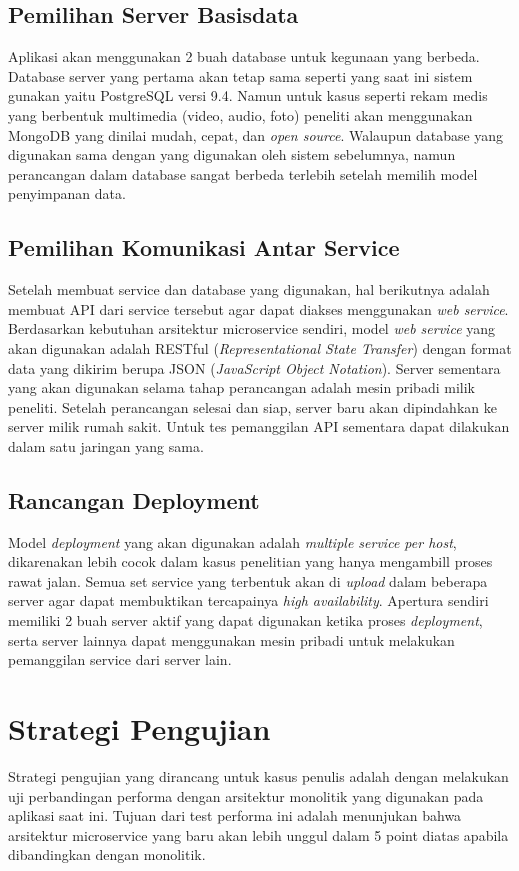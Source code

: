 \subsection{Pemilihan Server Basisdata}
Aplikasi akan menggunakan 2 buah database untuk kegunaan yang berbeda. Database server yang pertama akan tetap sama seperti yang saat ini sistem gunakan yaitu PostgreSQL versi 9.4. Namun untuk kasus seperti rekam medis yang berbentuk multimedia (video, audio, foto) peneliti akan menggunakan MongoDB yang dinilai mudah, cepat, dan \textit{open source}. Walaupun database yang digunakan sama dengan yang digunakan oleh sistem sebelumnya, namun perancangan dalam database sangat berbeda terlebih setelah memilih model penyimpanan data.
\subsection{Pemilihan Komunikasi Antar Service}
Setelah membuat service dan database yang digunakan, hal berikutnya adalah membuat API dari service tersebut agar dapat diakses menggunakan \textit{web service}. Berdasarkan kebutuhan arsitektur microservice sendiri, model \textit{web service} yang akan digunakan adalah RESTful (\textit{Representational State Transfer}) dengan format data yang dikirim berupa JSON (\textit{JavaScript Object Notation}). Server sementara yang akan digunakan selama tahap perancangan adalah mesin pribadi milik peneliti. Setelah perancangan selesai dan siap, server baru akan dipindahkan ke server milik rumah sakit. Untuk tes pemanggilan API sementara dapat dilakukan dalam satu jaringan yang sama.
\subsection{Rancangan Deployment}
Model \textit{deployment} yang akan digunakan adalah \textit{multiple service per host}, dikarenakan lebih cocok dalam kasus penelitian yang hanya mengambill proses rawat jalan. Semua set service yang terbentuk akan di \textit{upload} dalam beberapa server agar dapat membuktikan tercapainya \textit{high availability}. Apertura sendiri memiliki 2 buah server aktif yang dapat digunakan ketika proses \textit{deployment}, serta server lainnya dapat menggunakan mesin pribadi untuk melakukan pemanggilan service dari server lain.

\section{Strategi Pengujian}
Strategi pengujian yang dirancang untuk kasus penulis adalah dengan melakukan uji perbandingan performa dengan arsitektur monolitik yang digunakan pada aplikasi saat ini. Tujuan dari test performa ini adalah menunjukan bahwa arsitektur microservice yang baru akan lebih unggul dalam 5 point diatas apabila dibandingkan dengan monolitik.
